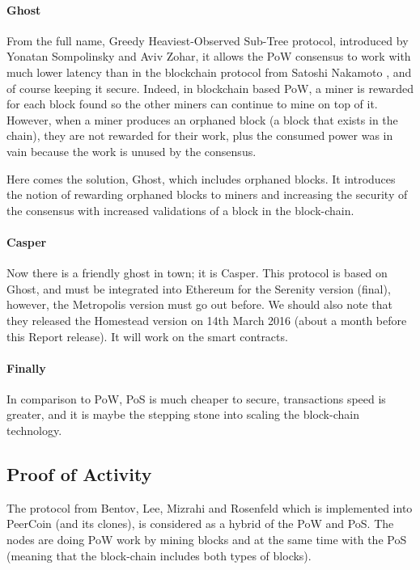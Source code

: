 \paragraph{Ghost}
From the full name, Greedy Heaviest-Observed Sub-Tree protocol, introduced by Yonatan Sompolinsky and Aviv Zohar\cite{Sompolinsky2014AcceleratingChains}, it allows the PoW consensus to work with much lower latency than in the blockchain protocol from Satoshi Nakamoto \cite{SatoshiNakamoto2008Bitcoin:System}, and of course keeping it secure. Indeed, in blockchain based PoW, a miner is rewarded for each block found so the other miners can continue to mine on top of it. However, when a miner produces an orphaned block (a block that exists in the chain), they are not rewarded for their work, plus the consumed power was in vain because the work is unused by the consensus.

Here comes the solution, Ghost, which includes orphaned blocks. It introduces the notion of rewarding orphaned blocks to miners and increasing the security of the consensus with increased validations of a block in the block-chain.

\paragraph{Casper}
Now there is a friendly ghost in town; it is Casper\cite{Buterin2015UnderstandingCasper}. This protocol is based on Ghost, and must be integrated into Ethereum for the Serenity\cite{Buterin2014SlasherStake} version (final), however, the Metropolis version must go out before. We should also note that they released the Homestead version on 14th March 2016 (about a month before this Report release). It will work on the smart contracts.

\paragraph{Finally}
In comparison to PoW, PoS is much cheaper to secure, transactions speed is greater, and it is maybe the stepping stone into scaling the block-chain technology.

\subsection{Proof of Activity}
The protocol from Bentov, Lee, Mizrahi and Rosenfeld  \cite{Bentov2013ProofStake} which is implemented into PeerCoin (and its clones), is considered as a hybrid of the PoW and PoS. The nodes are doing PoW work by mining blocks and at the same time with the PoS (meaning that the block-chain includes both types of blocks).

